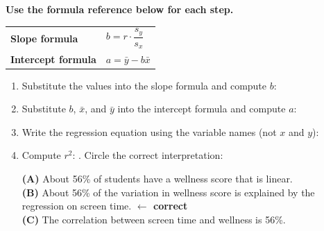 \documentclass[10pt]{article}
\begin{document}
\begin{tcolorbox}[colback=redbg, colframe=black!40, boxrule=0.7pt, arc=2mm,
    left=4mm, right=4mm, top=2.5mm, bottom=2.5mm,
    title={\textbf{Tier R --- Remediate}}, fonttitle=\bfseries]
\small

\textbf{Use the formula reference below for each step.}

\vspace{4pt}
\begin{tabularx}{\linewidth}{@{} >{\bfseries}p{4cm} X @{}}
Slope formula & $b = r \cdot \dfrac{s_y}{s_x}$ \\[4pt]
Intercept formula & $a = \bar{y} - b\bar{x}$ \\
\end{tabularx}

\vspace{8pt}
\begin{enumerate}[leftmargin=1.6em, itemsep=0.16in]
  \item Substitute the values into the slope formula and compute $b$:\\[6pt]

  \item Substitute $b$, $\bar{x}$, and $\bar{y}$ into the intercept formula and compute $a$:\\[6pt]

  \item Write the regression equation using the variable names (not $x$ and $y$):\\[6pt]

  \item Compute $r^2$: . Circle the correct interpretation:

        \vspace{6pt}
        \textbf{(A)} About 56\% of students have a wellness score that is linear.\\
        \textbf{(B)} About 56\% of the variation in wellness score is explained by the regression on screen time.
        \textcolor{keyred}{\textbf{$\leftarrow$ correct}}\\
        \textbf{(C)} The correlation between screen time and wellness is 56\%.
\end{enumerate}
\end{tcolorbox}
\end{document}
